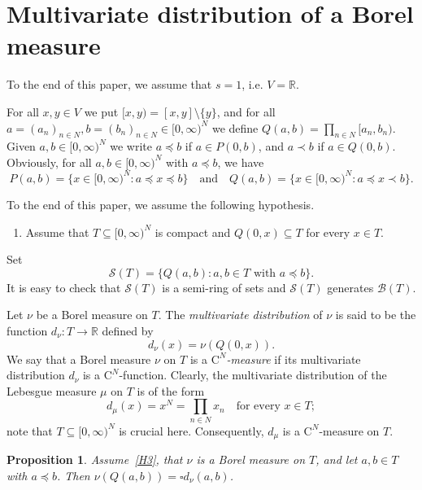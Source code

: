 \documentclass{amsart}
\theoremstyle{plain}%
\newtheorem{proposition}[theorem]{Proposition}
\theoremstyle{definition}
\theoremstyle{remark}
\begin{document}
\section{Multivariate distribution of a Borel measure}\label{section10}
To the end of this paper, we assume that $s=1$, i.e. $V=\mathbb R$.

For all $x,y\in V$ we put $[x,y)=[x,y]\setminus\{y\}$, and for all $a=(a_n)_{n\in N},b=(b_n)_{n\in N}\in [0,\infty)^N$ we define $Q(a,b)=\prod_{n\in N}[a_n,b_n)$.
Given $a,b\in [0,\infty)^N$ we write $a\preceq b$ if $a\in P(0,b)$, and 
$a\prec b$ if $a\in Q(0,b)$. Obviously, for all $a,b\in [0,\infty)^N$ with $a\preceq b$, we have
\begin{equation*}
P(a,b)=\big\{x\in [0,\infty)^N:a\preceq x\preceq b\big\}\quad\text{and}\quad
Q(a,b)=\big\{x\in [0,\infty)^N:a\preceq x\prec b\big\}.
\end{equation*} 

To the end of this paper, we assume the following hypothesis.
\begin{enumerate}[label={\rm (H$_3$)}]
  \item\label{H3} Assume that $T\subseteq [0,\infty)^N$ is compact and 
$Q(0,x)\subseteq T$ for every $x\in T$.
\end{enumerate}
Set 
\begin{equation*}
\mathcal{S}(T)=\big\{Q(a,b):a,b\in T\text{ with }a\preceq b\big\}.
\end{equation*}
It is easy to check that $\mathcal{S}(T)$ is a semi-ring of sets and $\mathcal{S}(T)$  generates $\mathcal{B}(T)$.

Let $\nu$ be a Borel measure on $T$. The \textit{multivariate distribution} of  $\nu$ is said to be the function $d_\nu\colon T\to\mathbb{R}$ defined by 
\begin{equation*}
d_\nu(x)=\nu(Q(0,x)).
\end{equation*}
We say that a Borel measure $\nu$ on $T$ is a \textit{$\mathrm{C}^N$-measure} if its multivariate distribution $d_\nu$ is a $\mathrm{C}^N$-function. Clearly, the multivariate distribution of the Lebesgue measure $\mu$ on $T$ is of the form
\begin{equation}\label{equ:distribution_of_Lebesgue_measure}
d_\mu(x)=x^N=\prod_{n\in N}x_n\quad\text{for every }x\in T;
\end{equation}
note that $T\subseteq[0,\infty)^N$ is crucial here. Consequently, $d_\mu$ is a $\mathrm{C}^N$-measure on $T$.

\begin{proposition}\label{prop:measureOfNinterval}
Assume~\cref{H3}, that $\nu$ is a Borel measure on $T$, and let $a,b\in T$ with $a\preceq b$. Then
$\nu(Q(a,b))=\square d_\nu(a,b)$.
\end{proposition}
\end{document}
